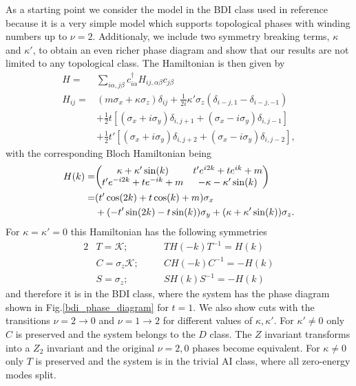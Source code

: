 \documentclass[twocolumn,amsmath,longbibliography,amssymb,superscriptaddress]{revtex4-1}
\begin{document}
As a starting point we consider the model in the BDI class used in reference \cite{Song2014} because it is a very simple model which supports topological phases with winding numbers up to $\nu =2$. Additionaly, we include two symmetry breaking terms, $\kappa$ and $\kappa'$, to obtain an even richer phase diagram and show that our results are not limited to any topological class. The Hamiltonian is then given by
\begin{align}
H =& \sum_{i\alpha,j\beta} c_{i\alpha}^\dagger H_{ij,\alpha \beta} c_{j\beta} \\
H_{ij} =& (m \sigma_x + \kappa \sigma_z)\delta_{ij}  + \frac{1}{2i}\kappa'\sigma_z (\delta_{i-j,1}-\delta_{i-j,-1})\\
&+ \frac{1}{2} t \left[(\sigma_x + i \sigma_y)\delta_{i,j+1} + (\sigma_x - i \sigma_y) \delta_{i,j-1} \right] \\
&+  \frac{1}{2} t' \left[(\sigma_x + i \sigma_y)\delta_{i,j+2} + (\sigma_x - i \sigma_y) \delta_{i,j-2} \right],
\label{bdi_model}
\end{align}
with the corresponding Bloch Hamiltonian being
\begin{align*}
H(k)=&\mqty( \kappa + \kappa' \sin(k) & t' e^{i2k} + t e^{ik}+m \\t' e^{-i2k} + t e^{-ik}+m & -\kappa-\kappa' \sin(k)  ) \\
=& (t' \cos(2k)+t\cos(k)+m)\sigma_x \\
&+ (-t' \sin(2k)-t\sin(k))\sigma_y + (\kappa+\kappa'\sin(k)) \sigma_z.
\end{align*}
For $\kappa = \kappa' = 0$ this Hamiltonian has the following symmetries
\begin{alignat*}{2}
&T = \mathcal{K} ; \quad &&T H(-k) T^{-1} = H(k) \\
&C = \sigma_z\mathcal{K} ; \quad &&C H(-k) C^{-1} = -H(k) \\
&S = \sigma_z ; \quad &&S H(k)S^{-1} = -H(k) 
\end{alignat*}
and therefore it is in the BDI class, where the system has the phase diagram shown in Fig.\ref{bdi_phase_diagram} for $t=1$. We also show cuts with the transitions $\nu = 2 \rightarrow 0$ and $\nu = 1 \rightarrow 2$ for different values of $\kappa,\kappa'$.  For $\kappa' \neq 0$ only $C$ is preserved and the system belongs to the $D$ class. The $Z$ invariant transforms into a $Z_2$ invariant and the original $\nu = 2,0$ phases become equivalent. For $\kappa \neq 0$ only $T$ is preserved and the system is in the trivial AI class, where all zero-energy modes split.
\end{document}
